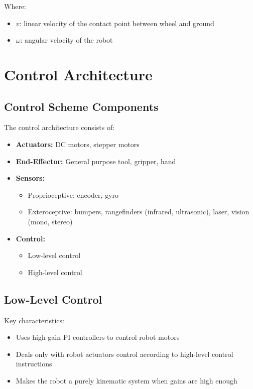 \documentclass[openany]{book}
\theoremstyle{definition}
\theoremstyle{remark}
\begin{document}
Where:
\begin{itemize}
    \item $v$: linear velocity of the contact point between wheel and ground
    \item $\omega$: angular velocity of the robot
\end{itemize}

\section{Control Architecture}

\subsection{Control Scheme Components}
The control architecture consists of:

\begin{itemize}
    \item \textbf{Actuators:} DC motors, stepper motors
    \item \textbf{End-Effector:} General purpose tool, gripper, hand
    \item \textbf{Sensors:}
    \begin{itemize}
        \item Proprioceptive: encoder, gyro
        \item Exteroceptive: bumpers, rangefinders (infrared, ultrasonic), laser, vision (mono, stereo)
    \end{itemize}
    \item \textbf{Control:}
    \begin{itemize}
        \item Low-level control
        \item High-level control
    \end{itemize}
\end{itemize}

\subsection{Low-Level Control}
Key characteristics:
\begin{itemize}
    \item Uses high-gain PI controllers to control robot motors
    \item Deals only with robot actuators control according to high-level control instructions
    \item Makes the robot a purely kinematic system when gains are high enough
\end{itemize}
\end{document}

